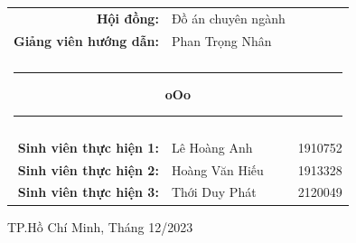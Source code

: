 \begin{titlepage}
    \vspace{1.5cm}

    \begingroup
        \fontsize{14pt}{12pt}\selectfont
        \begin{center}
            \begin{tabular}{rll}
                \color{black} \textbf{Hội đồng:} & \color{black} Đồ án chuyên ngành &  \\
                \color{black} \textbf{Giảng viên hướng dẫn:} & \color{black} Phan Trọng Nhân &  \\

                \\

                \multicolumn{3}{c}{\noindent\rule{4cm}{0.5pt} \textbf{oOo} \noindent\rule{4cm}{0.5pt}} \\ \\
                \color{black}\textbf{Sinh viên thực hiện 1:} & \color{black}Lê Hoàng Anh & \color{black}1910752 \\
                \color{black}\textbf{Sinh viên thực hiện 2:} & \color{black}Hoàng Văn Hiếu & \color{black}1913328 \\
                \color{black}\textbf{Sinh viên thực hiện 3:} & \color{black}Thới Duy Phát & \color{black}2120049 \\
            \end{tabular}
        \end{center}
    \endgroup
    
    \vspace{1.5cm}

    \begingroup
        \fontsize{12pt}{12pt}\selectfont
        \begin{center}
            {TP.Hồ Chí Minh, Tháng 12/2023}
        \end{center}
    \endgroup
    
\end{titlepage}